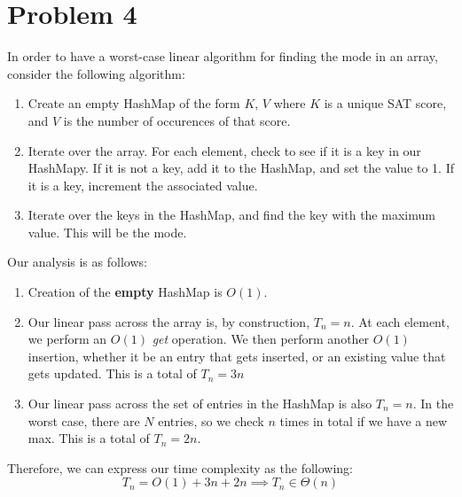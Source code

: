 \section*{Problem 4}
In order to have a worst-case linear algorithm for finding the mode in an array, consider the following algorithm:
\begin{enumerate}
    \item Create an empty HashMap of the form $K$, $V$ where $K$ is a 
    unique SAT score, and $V$ is the number of occurences of that score.
    \item Iterate over the array. For each element, check to see if it
          is a key in our HashMapy.
        \subitem If it is not a key, add it to the HashMap, and set the
                 value to 1.
        \subitem If it is a key, increment the associated value.
    \item Iterate over the keys in the HashMap, and find the key with
          the maximum value. This will be the mode. 
\end{enumerate}

Our analysis is as follows:\\
\begin{enumerate}
    \item Creation of the \textbf{empty} HashMap is $O(1)$.
    \item Our linear pass across the array is, by construction, $T_n = n$. At each element, we perform an $O(1)$ \textit{get} operation. We then perform another $O(1)$ insertion, whether it be an entry that gets inserted, or an existing value that gets updated. This is a total of $T_n = 3n$
    \item Our linear pass across the set of entries in the HashMap is also  $T_n = n$. In the worst case, there are $N$ entries, so we check $n$ times in total if we have a new max. This is a total of $T_n = 2n$.
\end{enumerate}
Therefore, we can express our time complexity as the following:
\\
$$
    T_n = O(1) + 3n + 2n \implies T_n \in \Theta(n)
$$
